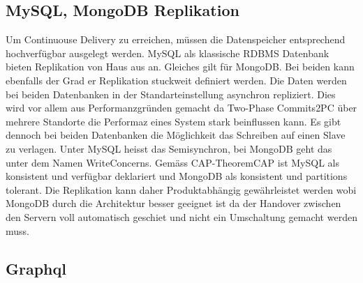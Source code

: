 \subsection{MySQL, MongoDB Replikation}

Um Continuouse Delivery zu erreichen, müssen die Datenspeicher entsprechend hochverfügbar ausgelegt werden. MySQL als klassische \Gls{RDBMS} Datenbank bieten Replikation von Haus aus an. Gleiches gilt für MongoDB. Bei beiden kann ebenfalls der Grad er Replikation stuckweit definiert werden. Die Daten werden bei beiden Datenbanken in der Standarteinstellung asynchron repliziert. Dies wird vor allem aus Performanzgründen gemacht da Two-Phase Commits\Gls{2PC} über mehrere Standorte die Performaz eines System stark beinflussen kann. Es gibt dennoch bei beiden Datenbanken die Möglichkeit das Schreiben auf einen Slave zu verlagen. Unter MySQL heisst das Semisynchron, bei MongoDB geht das unter dem Namen WriteConcerns. Gemäss CAP-Theorem\Gls{CAP} ist MySQL als konsistent und verfügbar deklariert und MongoDB als konsistent und partitions tolerant. Die Replikation kann daher Produktabhängig gewährleistet werden wobi MongoDB durch die Architektur besser geeignet ist da der Handover zwischen den Servern voll automatisch geschiet und nicht ein Umschaltung gemacht werden muss.

\subsection{Graphql}

